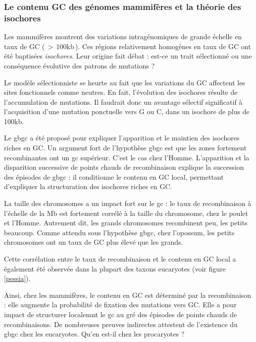 \documentclass[11pt, oneside]{scrartcl}
\begin{document}
\subsubsection{Le contenu GC des génomes mammifères et la théorie des isochores}
\label{sec:orgheadline12}
Les mammifères montrent des variations intragénomiques de grande échelle en taux
de GC\cite{eyre-walker_evolution_2001} ( \(>\) 100kb ). Ces régions relativement
homogènes en taux de GC ont été baptisées \emph{isochores}. Leur origine fait débat :
est-ce un trait sélectionné ou une conséquence évolutive des patrons de
mutations ?

Le modèle sélectionniste se heurte au fait que les variations du GC affectent
les sites fonctionnels comme neutres. En fait, l'évolution des isochores résulte
de l'accumulation de mutations. Il faudrait donc un avantage sélectif
significatif à l'acquisition d'une mutation ponctuelle vers G ou C, dans un
isochore de plus de 100kb.

Le \ac{gbgc} a été proposé pour expliquer l'apparition et le maintien des isochores
riches en GC\cite{duret_new_2006}. Un argument fort de l'hypothèse \ac{gbgc} est que
les zones fortement recombinantes ont un \ac{gc} supérieur. C'est le cas chez
l'Homme\cite{duret_impact_2008, berglund_hotspots_2009}. L'apparition et la
disparition successive de points chauds de recombinaison explique la succession
des épisodes de \ac{gbgc} : il conditionne le contenu en GC local, permettant
d'expliquer la structuration des isochores riches en GC. 

La taille des chromosomes a un impact fort sur le \ac{gc} : le taux de
recombinaison à l'échelle de la Mb est fortement corrélé à la taille du
chromosome, chez le poulet et l'Homme\cite{kaback_chromosome_1999}. Autrement
dit, les grands chromosomes recombinent peu, les petits beaucoup. Comme attendu
sous l'hypothèse \ac{gbgc}, chez l'opossum, les petits chromosomes ont un taux
de GC plus élevé que les grands.

Cette corrélation entre le taux de recombinaison et le contenu en GC local a
également été observée dans la plupart des taxons eucaryotes (voir figure
\ref{pessia}). 

\begin{transition}
  Ainsi, chez les mammifères, le contenu en GC est déterminé par la
  recombinaison : elle augmente la probabilité de fixation des mutations vers
  GC. Elle a pour impact de structurer localemnt le \ac{gc} au gré des épisodes
  de points chauds de recombinaisons. De nombreuses preuves indirectes attestent
  de l'existence du \ac{gbgc} chez les eucaryotes. Qu'en est-il chez les
  procaryotes ?
\end{transition}
\end{document}
